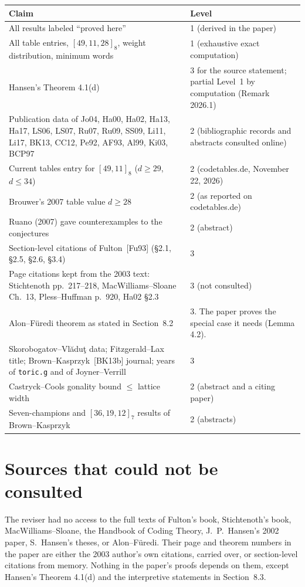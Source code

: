 \documentclass[12pt,letterpaper]{article}
\begin{document}
\begin{longtable}{@{}L{0.5\textwidth}L{0.42\textwidth}@{}}
\toprule
Claim & Level\\ \midrule
\endhead
All results labeled ``proved here'' & 1 (derived in the paper)\\
All table entries, $[49,11,28]_8$, weight distribution, minimum words & 1
(exhaustive exact computation)\\
Hansen's Theorem 4.1(d) & 3 for the source statement; partial Level~1 by
computation (Remark 2026.1)\\
Publication data of Jo04, Ha00, Ha02, Ha13, Ha17, LS06, LS07, Ru07, Ru09, SS09, Li11,
Li17, BK13, CC12, Pe92, AF93, Al99, Ki03, BCP97 & 2 (bibliographic records and
abstracts consulted online)\\
Current tables entry for $[49,11]_8$ ($d\ge29$, $d\le34$) & 2 (codetables.de,
November 22, 2026)\\
Brouwer's 2007 table value $d\ge28$ & 2 (as reported on codetables.de)\\
Ruano (2007) gave counterexamples to the conjectures & 2 (abstract)\\
Section-level citations of Fulton~[Fu93] (\S2.1, \S2.5, \S2.6, \S3.4) & 3\\
Page citations kept from the 2003 text: Stichtenoth pp.~217--218,
MacWilliams--Sloane Ch.~13, Pless--Huffman p.~920, Ha02 \S2.3 & 3 (not
consulted)\\
Alon--F\"uredi theorem as stated in Section~8.2 & 3. The paper proves the
special case it needs (Lemma 4.2).\\
Skorobogatov--Vl\u{a}du\c{t} data;
Fitzgerald--Lax title; Brown--Kasprzyk~[BK13b] journal; years of
\texttt{toric.g} and of Joyner--Verrill & 3\\
Castryck--Cools gonality bound $\le$ lattice width & 2 (abstract and a
citing paper)\\
Seven-champions and $[36,19,12]_7$ results of Brown--Kasprzyk & 2
(abstracts)\\
\bottomrule
\end{longtable}

\section{Sources that could not be consulted}

The reviser had no access to the full texts of Fulton's book, Stichtenoth's
book, MacWilliams--Sloane, the Handbook of Coding Theory, J.~P.~Hansen's 2002
paper, S.~Hansen's theses, or Alon--F\"uredi. Their page and theorem numbers
in the paper are either the 2003 author's own citations, carried over, or
section-level citations from memory. Nothing in the paper's proofs depends on
them, except Hansen's Theorem 4.1(d) and the interpretive statements in
Section~8.3.
\end{document}
